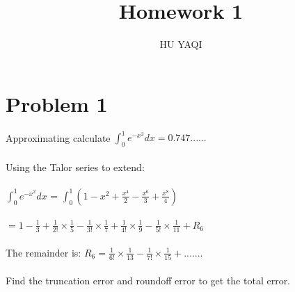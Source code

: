 \documentclass{article}
\title{ Homework 1 }
\author{HU YAQI}
\begin{document}
\maketitle
\setlength{\parindent}{0pt}

\section{ Problem 1 }
Approximating calculate $ \int_0^1 e^{-x^2} dx=0.747...... $\\
\\
Using the Talor series to extend:\\
\\
$\int_0^1 e^{-x^2} dx$ = $\int_0^1 (1-x^2+\frac{x^4}{2}-\frac{x^6}{3}+\frac{x^8}{4})$\\
\\
$=1-\frac{1}{3}+\frac{1}{2!}\times\frac{1}{5}-\frac{1}{3!}\times\frac{1}{7}+\frac{1}{4!}\times\frac{1}{9}-\frac{1}{5!}\times\frac{1}{11}+R_6$\\
\\
The remainder is: $R_6=\frac{1}{6!}\times\frac{1}{13}-\frac{1}{7!}\times\frac{1}{15}+.......$\\
\\
Find the truncation error and roundoff error to get the total error.
\end{document}

